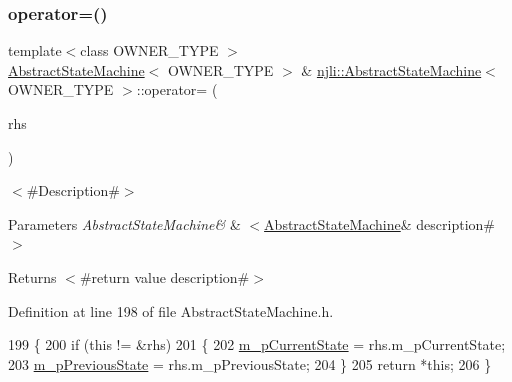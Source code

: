 \subsubsection{\texorpdfstring{operator=()}{operator=()}}
{\footnotesize\ttfamily template$<$class O\+W\+N\+E\+R\+\_\+\+T\+Y\+PE $>$ \\
\mbox{\hyperlink{classnjli_1_1_abstract_state_machine}{Abstract\+State\+Machine}}$<$ O\+W\+N\+E\+R\+\_\+\+T\+Y\+PE $>$ \& \mbox{\hyperlink{classnjli_1_1_abstract_state_machine}{njli\+::\+Abstract\+State\+Machine}}$<$ O\+W\+N\+E\+R\+\_\+\+T\+Y\+PE $>$\+::operator= (\begin{DoxyParamCaption}\item[{const \mbox{\hyperlink{classnjli_1_1_abstract_state_machine}{Abstract\+State\+Machine}}$<$ O\+W\+N\+E\+R\+\_\+\+T\+Y\+PE $>$ \&}]{rhs }\end{DoxyParamCaption})}

$<$\#\+Description\#$>$


\begin{DoxyParams}{Parameters}
{\em Abstract\+State\+Machine\&} & $<$\mbox{\hyperlink{classnjli_1_1_abstract_state_machine_a9656442a1a93737e55b72cdb3f7f6cfd}{Abstract\+State\+Machine}}\& description\#$>$\\
\hline
\end{DoxyParams}
\begin{DoxyReturn}{Returns}
$<$\#return value description\#$>$ 
\end{DoxyReturn}


Definition at line 198 of file Abstract\+State\+Machine.\+h.


\begin{DoxyCode}
199   \{
200     \textcolor{keywordflow}{if} (\textcolor{keyword}{this} != &rhs)
201       \{
202         \mbox{\hyperlink{classnjli_1_1_abstract_state_machine_ae82332bd955b01fa48471ec0613e8207}{m\_pCurrentState}} = rhs.m\_pCurrentState;
203         \mbox{\hyperlink{classnjli_1_1_abstract_state_machine_a43a2c2c7a36aba24176e5d6d82ab9f45}{m\_pPreviousState}} = rhs.m\_pPreviousState;
204       \}
205     \textcolor{keywordflow}{return} *\textcolor{keyword}{this};
206   \}
\end{DoxyCode}
\mbox{\label{classnjli_1_1_abstract_state_machine_a0ef8fbf451f61eaccc97319751fe76c3}} 
